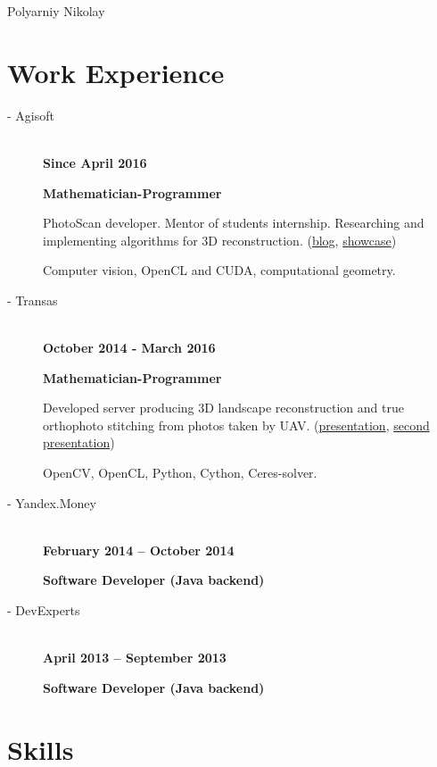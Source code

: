 \documentclass[11pt,oneside]{article}
\newcommand{\hhref}[2]{\href{#1}{\color{blue}#2}}
\begin{document}
\begin{center}
	{\huge Polyarniy Nikolay}
\end{center}


\vspace{-9pt}
\section*{\textbf{Work Experience}}
\vspace{-9pt}

\begin{description}
  \item[ - Agisoft] \hfill \\
    \textbf{Since April 2016}
  
    \textbf{Mathematician-Programmer}
    
    PhotoScan developer. Mentor of students internship. Researching and implementing algorithms for 3D reconstruction. (\hhref{http://www.agisoft.com/community/blog/}{blog}, \hhref{http://www.agisoft.com/community/showcase/}{showcase})
    
    Computer vision, OpenCL and CUDA, computational geometry.
  \item[ - Transas] \hfill \\
    \textbf{October 2014 - March 2016}
  
    \textbf{Mathematician-Programmer}
    
    Developed server producing 3D landscape reconstruction and true orthophoto stitching from photos taken by UAV. (\hhref{http://polarnick239.github.io/old/cv/Monoceros1.pdf}{presentation}, \hhref{http://polarnick239.github.io/old/cv/Monoceros2.pdf}{second presentation})
    
    OpenCV, OpenCL, Python, Cython, Ceres-solver.
  \item[ - Yandex.Money] \hfill \\
    \textbf{February 2014 – October 2014}
    
    \textbf{Software Developer (Java backend)}
  \item[ - DevExperts] \hfill \\
    \textbf{April 2013 – September 2013}
    
    \textbf{Software Developer (Java backend)}
    
\end{description}


\vspace{-9pt}
\section*{\textbf{Skills}}
\vspace{-9pt}
\end{document}
